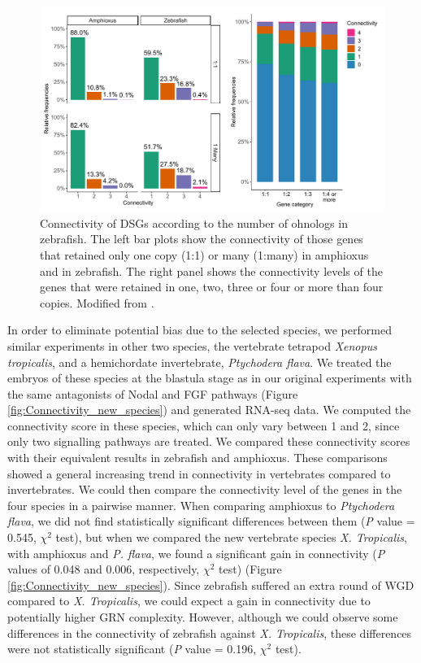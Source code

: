 \begin{figure}[h]
\centering
\includegraphics[width=1\textwidth]{Figures/Connectivity_genes_wgd}
\caption[Connectivity of DSGs according to their ohnologs]{
Connectivity of DSGs according to the number of ohnologs in zebrafish. The left bar plots show the connectivity of those genes that retained only one copy (1:1) or many (1:many) in amphioxus and in zebrafish. The right panel shows the connectivity levels of the genes that were retained in one, two, three or four or more than four copies. Modified from \parencite{gil-galvez_gain_2022}. }
\label{fig:Connectivity_genes_wgd}
\end{figure} 

In order to eliminate potential bias due to the selected species, we performed similar experiments in other two species, the vertebrate tetrapod \textit{Xenopus tropicalis}, and a hemichordate invertebrate, \textit{Ptychodera flava}. We treated the embryos of these species at the blastula stage as in our original experiments with the same antagonists of Nodal and FGF pathways (Figure \ref{fig:Connectivity_new_species}) and generated RNA-seq data. We computed the connectivity score in these species, which can only vary between 1 and 2, since only two signalling pathways are treated. We compared these connectivity scores with their equivalent results in zebrafish and amphioxus. These comparisons showed a general increasing trend in connectivity in vertebrates compared to invertebrates. We could then compare the connectivity level of the genes in the four species in a pairwise manner. When comparing amphioxus to \textit{Ptychodera flava}, we did not find statistically significant differences between them (\textit{P} value = 0.545, \(\chi^2\) test), but when we compared the new vertebrate species \textit{X. Tropicalis}, with amphioxus and \textit{P. flava}, we found a significant gain in connectivity (\textit{P} values of 0.048 and 0.006, respectively, \(\chi^2\) test) (Figure \ref{fig:Connectivity_new_species}). Since zebrafish suffered an extra round of WGD compared to \textit{X. Tropicalis}, we could expect a gain in connectivity due to potentially higher GRN complexity. However, although we could observe some differences in the connectivity of zebrafish against \textit{X. Tropicalis}, these differences were not statistically significant (\textit{P} value = 0.196, \(\chi^2\) test). 





